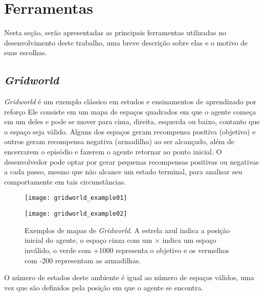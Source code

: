 \section{Ferramentas}
\label{sec:tools}
Nesta seção, serão apresentadas as principais ferramentas utilizadas no desenvolvimento deste trabalho, uma breve descrição sobre elas e o motivo de suas escolhas.

\subsection{\textit{Gridworld}}
\label{sec:gridworld}

\textit{Gridworld} é um exemplo clássico em estudos e ensinamentos de aprendizado por reforço
Ele consiste em um mapa de espaços quadrados em que o agente começa em um deles e pode se mover para cima, direita, esquerda ou baixo, contanto que o espaço seja válido.
Alguns dos espaços geram recompensa positiva (objetivo) e outros geram recompensa negativa (armadilha) ao ser alcançado, além de encerrarem o episódio e fazerem o agente retornar ao ponto inicial.
O desenvolvedor pode optar por gerar pequenas recompensas positivas ou negativas a cada passo, mesmo que não alcance um estado terminal, para analisar seu comportamente em tais circunstâncias.

\begin{figure}[h!]
  \begin{minipage}[b]{.6\textwidth}
  \centering
  \texttt{[image: gridworld\_example01]}
  \end{minipage}
  \hfill
  \begin{minipage}[b]{.35\textwidth}
  \texttt{[image: gridworld\_example02]}
  \end{minipage}
  \centering
  \caption{Exemplos de mapas de \textit{Gridworld}. A estrela azul indica a posição inicial do agente, o espaço cinza com um $\times$ indica um espaço inválido, o verde com +1000 representa o objetivo e os vermelhos com -200 representam as armadilhas.}
\end{figure}

O número de estados deste ambiente é igual ao número de espaços válidos, uma vez que são definidos pela posição em que o agente se encontra.

